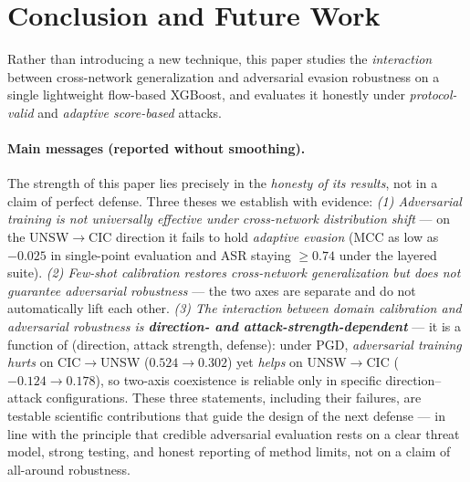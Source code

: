 \documentclass[preprint,12pt,authoryear]{elsarticle}
\begin{document}
\section{Conclusion and Future Work}
\label{sec:conclusion}
Rather than introducing a new technique, this paper studies the \emph{interaction}
between cross-network generalization and adversarial evasion robustness on a single
lightweight flow-based XGBoost, and evaluates it honestly under \emph{protocol-
valid} and \emph{adaptive score-based} attacks.

\paragraph{Main messages (reported without smoothing).} The strength of this paper
lies precisely in the \emph{honesty of its results}, not in a claim of perfect
defense. Three theses we establish with evidence:
\emph{(1) Adversarial training is not universally effective under cross-network
distribution shift} --- on the UNSW$\rightarrow$CIC direction it fails to hold
\emph{adaptive evasion} (MCC as low as $-0.025$ in single-point evaluation and ASR
staying $\ge0.74$ under the layered suite).
\emph{(2) Few-shot calibration restores cross-network generalization but does not
guarantee adversarial robustness} --- the two axes are separate and do not
automatically lift each other.
\emph{(3) The interaction between domain calibration and adversarial robustness is
\textbf{direction- and attack-strength-dependent}} --- it is a function of (direction,
attack strength, defense): under PGD, \emph{adversarial training} \emph{hurts} on
CIC$\rightarrow$UNSW ($0.524\rightarrow0.302$) yet \emph{helps} on
UNSW$\rightarrow$CIC ($-0.124\rightarrow0.178$), so two-axis coexistence is reliable
only in specific direction--attack configurations. These three statements, including their
failures, are testable scientific contributions that guide the design of the next
defense --- in line with the principle that credible adversarial evaluation rests on
a clear threat model, strong testing, and honest reporting of method limits, not on
a claim of all-around robustness.
\end{document}
